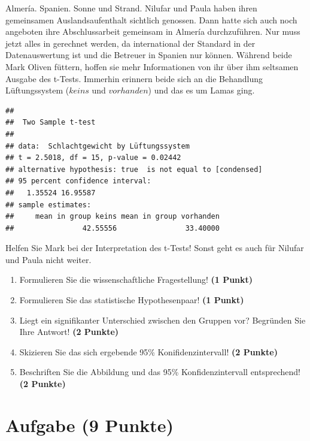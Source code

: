 \documentclass[a4paper, 9pt]{scrartcl}\usepackage[]{graphicx}\usepackage[]{xcolor}
\makeatletter
\newenvironment{kframe}{%
 \def\at@end@of@kframe{}%
 \ifinner\ifhmode%
  \def\at@end@of@kframe{\end{minipage}}%
  \begin{minipage}{\columnwidth}%
 \fi\fi%
 \def\FrameCommand##1{\hskip\@totalleftmargin \hskip-\fboxsep
 \colorbox{shadecolor}{##1}\hskip-\fboxsep
     \hskip-\linewidth \hskip-\@totalleftmargin \hskip\columnwidth}%
 \MakeFramed {\advance\hsize-\width
   \@totalleftmargin\z@ \linewidth\hsize
   \@setminipage}}%
 {\par\unskip\endMakeFramed%
 \at@end@of@kframe}
\newenvironment{knitrout}{}{} %
\makeatother
\begin{document}
Almería. Spanien. Sonne und Strand. Nilufar und Paula haben ihren gemeinsamen Auslandsaufenthalt sichtlich genossen. Dann hatte sich auch noch angeboten ihre Abschlussarbeit gemeinsam in Almería durchzuführen. Nur muss jetzt alles in \Rlogo gerechnet werden, da \Rlogo international der Standard in der Datenauswertung ist und die Betreuer in Spanien nur \Rlogo können. Während beide Mark Oliven füttern, hoffen sie mehr Informationen von ihr über ihm seltsamen \Rlogo Ausgabe des t-Tests. Immerhin erinnern beide sich an die Behandlung Lüftungssystem ($keins$ und $vorhanden$) und das es um Lamas ging.

\begin{knitrout}
\color{fgcolor}\begin{kframe}
\begin{verbatim}
## 
## 	Two Sample t-test
## 
## data:  Schlachtgewicht by Lüftungssystem
## t = 2.5018, df = 15, p-value = 0.02442
## alternative hypothesis: true  is not equal to [condensed]
## 95 percent confidence interval:
##   1.35524 16.95587
## sample estimates:
##     mean in group keins mean in group vorhanden 
##                42.55556                33.40000
\end{verbatim}
\end{kframe}
\end{knitrout}

Helfen Sie Mark bei der Interpretation des t-Tests! Sonst geht es auch für Nilufar und Paula nicht weiter.

\begin{enumerate}
  \item Formulieren Sie die wissenschaftliche Fragestellung! \textbf{(1 Punkt)}
  \item Formulieren Sie das statistische Hypothesenpaar! \textbf{(1 Punkt)}
\item Liegt ein signifikanter Unterschied zwischen den Gruppen vor? Begründen Sie Ihre Antwort! \textbf{(2 Punkte)}
\item Skizieren Sie das sich ergebende 95\% Konifidenzintervall! \textbf{(2 Punkte)}
\item Beschriften Sie die Abbildung und das 95\% Konfidenzintervall entsprechend! \textbf{(2 Punkte)}  
\end{enumerate} 
\clearpage

\section{Aufgabe \hfill (9 Punkte)}
\end{document}
